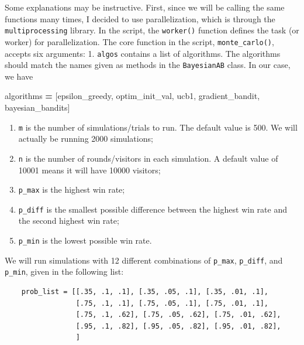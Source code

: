 \documentclass[
]{book}
\newenvironment{Shaded}{\begin{snugshade}}{\end{snugshade}}
\newcommand{\NormalTok}[1]{#1}
\newcommand{\OperatorTok}[1]{\textcolor[rgb]{0.81,0.36,0.00}{\textbf{#1}}}
\newcommand{\StringTok}[1]{\textcolor[rgb]{0.31,0.60,0.02}{#1}}
\providecommand{\tightlist}{%
  \setlength{\itemsep}{0pt}\setlength{\parskip}{0pt}}
\theoremstyle{definition}
\theoremstyle{definition}
\theoremstyle{definition}
\theoremstyle{definition}
\theoremstyle{remark}
\begin{document}
Some explanations may be instructive. First, since we will be calling the same functions many times, I decided to use parallelization, which is through the \texttt{multiprocessing} library. In the script, the \texttt{worker()} function defines the task (or worker) for parallelization. The core function in the script, \texttt{monte\_carlo()}, accepts six arguments:
1. \texttt{algos} contains a list of algorithms. The algorithms should match the names given as methods in the \texttt{BayesianAB} class. In our case, we have

\begin{Shaded}
\begin{Highlighting}[]
\NormalTok{algorithms }\OperatorTok{=}\NormalTok{ [}\StringTok{\textquotesingle{}epsilon\_greedy\textquotesingle{}}\NormalTok{, }\StringTok{\textquotesingle{}optim\_init\_val\textquotesingle{}}\NormalTok{, }\StringTok{\textquotesingle{}ucb1\textquotesingle{}}\NormalTok{, }\StringTok{\textquotesingle{}gradient\_bandit\textquotesingle{}}\NormalTok{, }\StringTok{\textquotesingle{}bayesian\_bandits\textquotesingle{}}\NormalTok{]}
\end{Highlighting}
\end{Shaded}

\begin{enumerate}
\def\labelenumi{\arabic{enumi}.}
\setcounter{enumi}{1}
\tightlist
\item
  \texttt{m} is the number of simulations/trials to run. The default value is 500. We will actually be running 2000 simulations;
\item
  \texttt{n} is the number of rounds/visitors in each simulation. A default value of 10001 means it will have 10000 visitors;
\item
  \texttt{p\_max} is the highest win rate;
\item
  \texttt{p\_diff} is the smallest possible difference between the highest win rate and the second highest win rate;
\item
  \texttt{p\_min} is the lowest possible win rate.
\end{enumerate}

We will run simulations with 12 different combinations of \texttt{p\_max}, \texttt{p\_diff}, and \texttt{p\_min}, given in the following list:

\begin{verbatim}
    prob_list = [[.35, .1, .1], [.35, .05, .1], [.35, .01, .1],
                 [.75, .1, .1], [.75, .05, .1], [.75, .01, .1],
                 [.75, .1, .62], [.75, .05, .62], [.75, .01, .62],
                 [.95, .1, .82], [.95, .05, .82], [.95, .01, .82],
                 ]
\end{verbatim}
\end{document}
